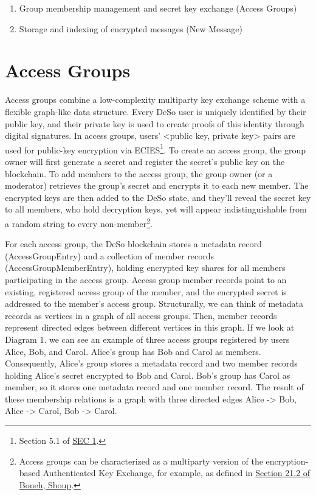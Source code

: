 \documentclass[oneside, 12pt]{article}
\newcommand{\fn}[1]{\footnote{\hangpara{1.4em}{1} #1}}
\begin{document}
\begin{enumerate}
  \item Group membership management and secret key exchange (Access Groups)
  \item Storage and indexing of encrypted messages (New Message)
\end{enumerate}

\section{Access Groups}
Access groups combine a low-complexity multiparty key exchange scheme with a flexible graph-like data structure. Every DeSo user is uniquely identified by their public key, and their private key is used to create proofs of this identity through digital signatures. In access groups, users’ <public key, private key> pairs are used for public-key encryption via ECIES\fn{Section 5.1 of \href{https://www.secg.org/sec1-v2.pdf}{SEC 1}.}. To create an access group, the group owner will first generate a secret and register the secret’s public key on the blockchain. To add members to the access group, the group owner (or a moderator) retrieves the group’s secret and encrypts it to each new member. The encrypted keys are then added to the DeSo state, and they’ll reveal the secret key to all members, who hold decryption keys, yet will appear indistinguishable from a random string to every non-member\fn{Access groups can be characterized as a multiparty version of the encryption-based Authenticated Key Exchange, for example, as defined in \href{http://toc.cryptobook.us/book.pdf}{Section 21.2 of Boneh, Shoup}.}.

For each access group, the DeSo blockchain stores a metadata record (AccessGroupEntry) and a collection of member records (AccessGroupMemberEntry), holding encrypted key shares for all members participating in the access group. Access group member records point to an existing, registered access group of the member, and the encrypted secret is addressed to the member’s access group. Structurally, we can think of metadata records as vertices in a graph of all access groups. Then, member records represent directed edges between different vertices in this graph. If we look at Diagram 1. we can see an example of three access groups registered by users Alice, Bob, and Carol. Alice’s group has Bob and Carol as members. Consequently, Alice’s group stores a metadata record and two member records holding Alice’s secret encrypted to Bob and Carol. Bob’s group has Carol as member, so it stores one metadata record and one member record. The result of these membership relations is a graph with three directed edges Alice -> Bob, Alice -> Carol, Bob -> Carol.
\end{document}
